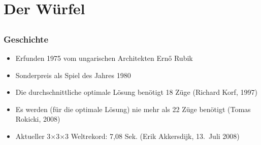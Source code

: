 \section{Der Würfel} %
\label{sec:the_cube}
\subsection*{}

\begin{frame}
	\frametitle{Geschichte}

	\begin{itemize}
		\item Erfunden 1975 vom ungarischen Architekten Ern\H o Rubik
		\item Sonderpreis als \glqq Spiel des Jahres\grqq{} 1980
		\item Die durchschnittliche optimale Lösung benötigt 18 Züge (Richard Korf, 1997)
		\item Es werden (für die optimale Lösung) nie mehr als 22 Züge benötigt (Tomas Rokicki, 2008)
		\item Aktueller 3$\times$3$\times$3 Weltrekord: 7,08 Sek. (Erik Akkersdijk, 13.~Juli 2008)
	\end{itemize}
	
\end{frame}

